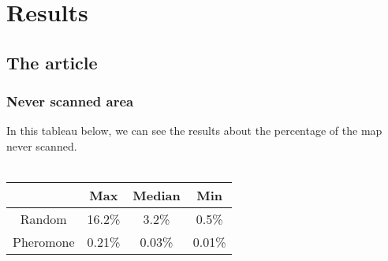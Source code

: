 \chapter{Results}

\section{The article}

\subsection{Never scanned area}

In this tableau below, we can see the results about the percentage of the map never scanned.\\\\
\begin{tabular}{|c|c|c|c|}
\hline
	      & Max & Median & Min \\
	      \hline
	Random & 16.2\% & 3.2\% & 0.5\% \\
	\hline
	Pheromone & 0.21\% & 0.03\% & 0.01\% \\
	\hline
\end{tabular}